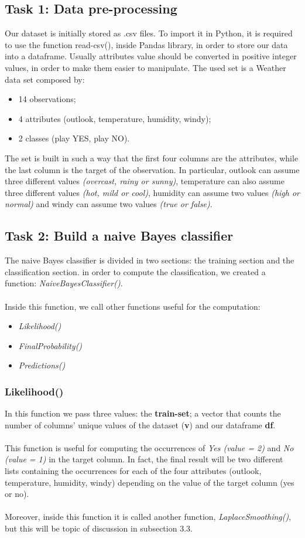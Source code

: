 \documentclass[10pt]{article}
\begin{document}
\subsection{Task 1: Data pre-processing}
Our dataset is initially stored as .csv files. To import it in Python, it is required to use the function read-csv(), inside Pandas library, in order to store our data into a dataframe.
Usually attributes value should be converted
in positive integer values, in order to make them easier to
manipulate.
\newpage 
The used set is a Weather data set composed by:
\begin{itemize}
 \item  14 observations;
 \item 4 attributes (outlook, temperature, humidity, windy);
 \item 2 classes (play YES, play NO).
 \end{itemize}
The set is built in such a way that the first four columns
are the attributes, while the last column is the target of the
observation. In particular, outlook can assume three different
values \textit{(overcast, rainy or sunny)}, temperature can also assume
three different values \textit{(hot, mild or cool)}, humidity can assume
two values \textit{(high or normal)} and windy can assume two values
\textit{(true or false)}.

\subsection{Task 2: Build a naive Bayes classifier}
The naive Bayes classifier is divided in two sections: the
training section and the classification section. in order to compute the classification, we created a function: \textit{NaiveBayesClassifier()}.\\\\
Inside this function, we call other functions useful for the computation:
\begin{itemize}
    \item \textit{Likelihood()}
    \item \textit{FinalProbability()}
    \item \textit{Predictions()}
\end{itemize}
\subsubsection{Likelihood()}
In this function we pass three values: the \textbf{train-set}; a vector that counts the number of columns' unique values of the dataset (\textbf{v}) and our dataframe \textbf{df}.\\\\
This function is useful for computing the occurrences of \textit{Yes (value = 2)} and \textit{No (value = 1)} in the target column. In fact, the final result will be two different lists containing the occurrences for each of the four attributes (outlook, temperature, humidity, windy) depending on the value of the target column (yes or no).
\\\\ 
Moreover, inside this function it is called another function, \textit{LaplaceSmoothing()}, but this will be topic of discussion in subsection 3.3.
\end{document}
